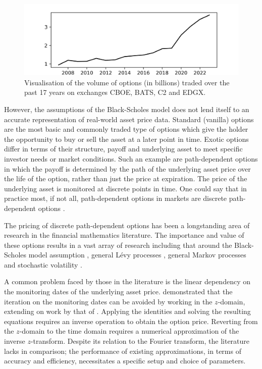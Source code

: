 \documentclass[a4paper]{report}
\begin{document}
\begin{figure}[h]
	\centering
	\includegraphics[width=0.7\linewidth]{images/options_volume.png}
	\captionsetup{justification=centering}
    \caption{Visualisation of the volume of options (in billions) traded over the past 17 years on exchanges CBOE, BATS, C2 and EDGX.}
    \label{fig:volume_of_options}
\end{figure}
However, the assumptions of the Black-Scholes model does not lend itself to an accurate representation of real-world asset price data. Standard (vanilla) options are the most basic and commonly traded type of options which give the holder the opportunity to buy or sell the asset at a later point in time. Exotic options differ in terms of their structure, payoff and underlying asset to meet specific investor needs or market conditions. Such an example are path-dependent options in which the payoff is determined by the path of the underlying asset price over the life of the option, rather than just the price at expiration. The price of the underlying asset is monitored at discrete points in time. One could say that in practice most, if not all, path-dependent options in markets are discrete path-dependent options \citep{kou2007discrete}. 

The pricing of discrete path-dependent options has been a longstanding area of research in the financial mathematics literature. The importance and value of these options results in a vast array of research including that around the Black-Scholes model assumption \citep{lu2017improved, guardasoni2020mellin}, general L\'evy processes \citep{fang2009novel, fusai2016spitzer, phelan2018fourier, chen2021sinc, levendorskii2022sinh}, general Markov processes \citep{cui2021pricing, zhang2023general} and stochastic volatility \citep{soleymani2019pricing, kirkby2020efficient}.

A common problem faced by those in the literature is the linear dependency on the monitoring dates of the underlying asset price. \citet{fusai2016spitzer} demonstrated that the iteration on the monitoring dates can be avoided by working in the $z$-domain, extending on work by that of \citet{carr1999option}. Applying the \citet{spitzer1957wiener} identities and solving the resulting equations requires an inverse operation to obtain the option price. Reverting from the $z$-domain to the time domain requires a numerical approximation of the inverse $z$-transform. Despite its relation to the Fourier transform, the literature lacks in comparison; the performance of existing approximations, in terms of accuracy and efficiency, necessitates a specific setup and choice of parameters.
\end{document}
